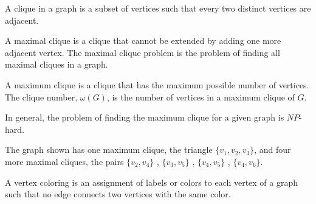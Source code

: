 \documentclass{beamer}
\begin{document}
{\begin{defi}
A clique in a graph is a subset of vertices such that every two distinct vertices are adjacent. 

A maximal clique is a clique that cannot be extended by adding one more adjacent vertex. The maximal clique problem is the problem of finding all maximal cliques in a graph.

A maximum clique is a clique that has the maximum possible number of vertices. The clique number, $\omega(G)$, is the number of vertices in a maximum clique of $G$. 
\end{defi}

\begin{theorem}
In general, the problem of finding the maximum clique for a given graph is $NP$-hard\cite{karp}.
\end{theorem}

\begin{exam}
The graph shown has one maximum clique, the triangle $\{v_1 , v_2 , v_3\}$, and four more maximal cliques, the pairs 
$\{v_2 , v_4\}$ , $\{v_3 , v_5\}$ , $\{v_4 , v_5\}$ , $\{v_4 , v_6\}$.
\vspace{1cm}
\begin{center}
\end{center}
\end{exam}

\begin{defi}
A vertex coloring is an assignment of labels or colors to each
vertex of a graph such that no edge connects two vertices with the same color.


\end{defi}}
\end{document}
